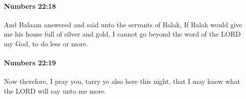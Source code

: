 		\paragraph{Numbers 22:18} %
			\label{NUMBERS-22-18}

			And Balaam answered and said unto the servants of Balak, If Balak would give me his house full of silver and gold, I cannot go beyond the word of the LORD my God, to do less or more.


		\paragraph{Numbers 22:19} %
			\label{NUMBERS-22-19}

			Now therefore, I pray you, tarry ye also here this night, that I may know what the LORD will say unto me more.


